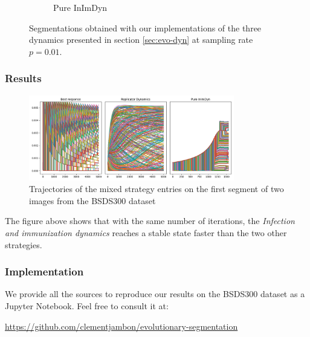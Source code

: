 \documentclass{beamer}
\begin{document}
\begin{frame}
\begin{figure}
\begin{subfigure}[b]{0.25\textwidth}
            \caption{Pure InImDyn}
        \end{subfigure}
           \caption{Segmentations obtained with our implementations of the three dynamics presented in section \ref{sec:evo-dyn} at sampling rate $p=0.01$.}
           \label{fig:results-dynamics}
    \end{figure}
\end{frame}

\begin{frame}
    \frametitle{Results}
    \begin{figure}
        \centering
        \includegraphics[width=0.8\textwidth]{../figures/trajectories/102061.png}
        \caption{Trajectories of the mixed strategy entries on the first segment of two images from the BSDS300 dataset}
        \label{fig:trajectories}
    \end{figure}
    The figure above shows that with the same number of iterations, the \textit{Infection and immunization dynamics} reaches a stable state faster than the two other strategies.
\end{frame}

\begin{frame}
    \frametitle{Implementation}
    We provide all the sources to reproduce our results on the BSDS300\cite{bsds300} dataset as a Jupyter Notebook. Feel free to consult it at:
    \begin{center}
        \url{https://github.com/clementjambon/evolutionary-segmentation}
    \end{center}
\end{frame}

\begin{frame}[shrink=30]

  
\end{frame}
  
\end{document}
